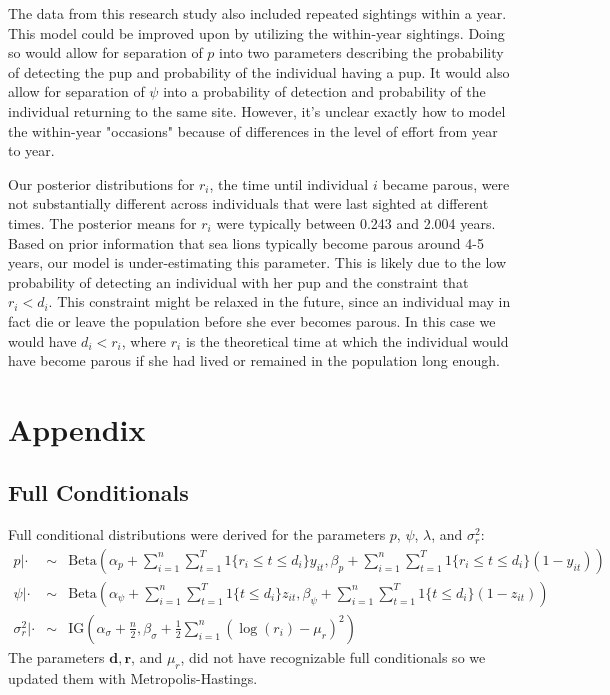 \documentclass[12pt, a4paper]{article}
\begin{document}
The data from this research study also included repeated sightings within a year. This model could be improved upon by utilizing the within-year sightings. Doing so would allow for separation of $p$ into two parameters describing the probability of detecting the pup and probability of the individual having a pup. It would also allow for separation of $\psi$ into a probability of detection and probability of the individual returning to the same site. However, it's unclear exactly how to model the within-year "occasions" because of differences in the level of effort from year to year. 

Our posterior distributions for $r_i$, the time until individual $i$ became parous, were not substantially different across individuals that were last sighted at different times.  The posterior means for $r_i$ were typically between 0.243 and 2.004 years. Based on prior information that sea lions typically become parous around 4-5 years, our model is under-estimating this parameter. This is likely due to the low probability of detecting an individual with her pup and the constraint that $r_i < d_i$. This constraint might be relaxed in the future, since an individual may in fact die or leave the population before she ever becomes parous. In this case we would have $d_i < r_i$, where $r_i$ is the theoretical time at which the individual would have become parous if she had lived or remained in the population long enough. 




\section{Appendix}

\subsection{Full Conditionals}

Full conditional distributions were derived for the parameters $p$, $\psi$, $\lambda$, and $\sigma_r^2$:
\begin{eqnarray*}
p | \cdot & \sim & \text{Beta} \left( \alpha_p + \sum_{i=1}^n \sum_{t=1}^T 1 \{ r_i \leq t \leq d_i \} y_{it}, \beta_p + \sum_{i=1}^n \sum_{t=1}^T 1\{ r_i \leq t \leq d_i \} (1 - y_{it}) \right)  \\
\psi | \cdot & \sim & \text{Beta}\left( \alpha_{\psi} + \sum_{i=1}^n \sum_{t=1}^T 1\{ t \leq d_i\} z_{it}, \beta_{\psi} + \sum_{i=1}^n \sum_{t=1}^T 1\{ t \leq d_i \} (1 - z_{it}) \right) \\
\sigma_{r}^2 | \cdot & \sim & \text{IG} \left( \alpha_{\sigma} + \frac{n}{2}, \beta_{\sigma} + \frac{1}{2} \sum_{i=1}^n ( \log(r_i) - \mu_r)^2 \right)
\end{eqnarray*}
The parameters $\mathbf{d}, \mathbf{r}$, and $\mu_r$, did not have recognizable full conditionals so we updated them with Metropolis-Hastings.
\end{document}
